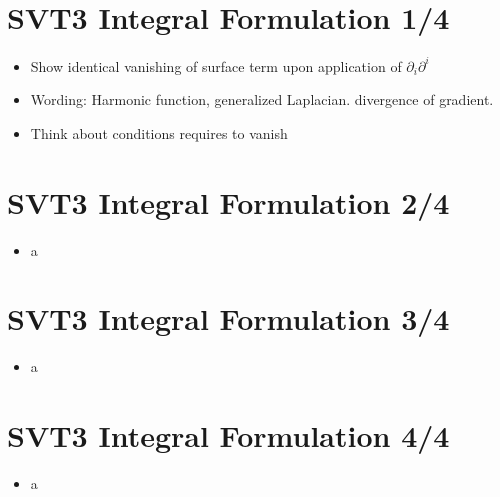 \documentclass[10pt,letterpaper]{article}
\numberwithin{equation}{section}
\begin{document}

\section{SVT3 Integral Formulation 1/4}
\begin{itemize}
	\item Show identical vanishing of surface term upon application of $\partial_i \partial^i$
	\item Wording: Harmonic function, generalized  Laplacian. divergence of gradient. 
	\item Think about conditions requires to vanish
\end{itemize}

\section{SVT3 Integral Formulation 2/4}
\begin{itemize}
	\item a
\end{itemize}


\section{SVT3 Integral Formulation 3/4}
\begin{itemize}
	\item a
\end{itemize}


\section{SVT3 Integral Formulation 4/4}
\begin{itemize}
	\item a
\end{itemize}
\end{document}
